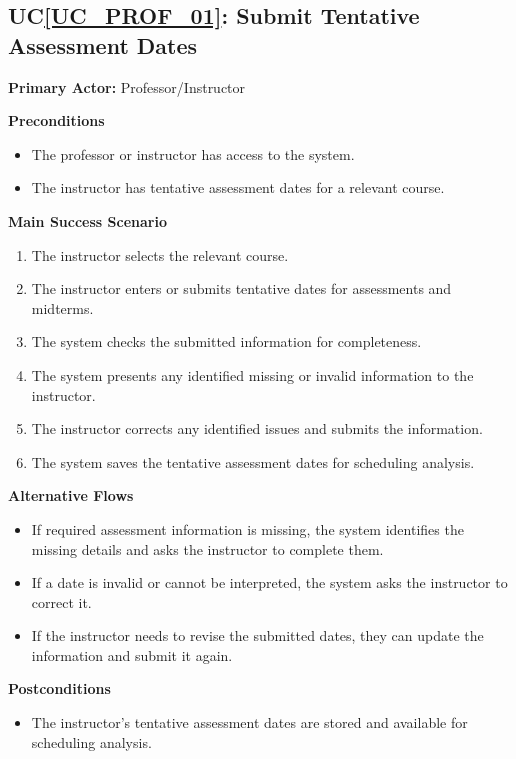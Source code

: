 \documentclass[12pt]{article}
\newcounter{ucnum} %
\newcommand{\ucref}[1]{UC\ref{#1}}
\begin{document}
 \label{UC_PROF_01}
\subsection{\ucref{UC_PROF_01}: Submit Tentative Assessment Dates}

\noindent \textbf{Primary Actor:} Professor/Instructor

\noindent \textbf{Preconditions}
\begin{itemize}
  \item The professor or instructor has access to the system.
  \item The instructor has tentative assessment dates for a relevant course.
\end{itemize}

\noindent \textbf{Main Success Scenario}
\begin{enumerate}
  \item The instructor selects the relevant course.
  \item The instructor enters or submits tentative dates for assessments and midterms.
  \item The system checks the submitted information for completeness.
  \item The system presents any identified missing or invalid information to the instructor.
  \item The instructor corrects any identified issues and submits the information.
  \item The system saves the tentative assessment dates for scheduling analysis.
\end{enumerate}

\noindent \textbf{Alternative Flows}
\begin{itemize}
  \item If required assessment information is missing, the system identifies the missing details and asks the instructor to complete them.
  \item If a date is invalid or cannot be interpreted, the system asks the instructor to correct it.
  \item If the instructor needs to revise the submitted dates, they can update the information and submit it again.
\end{itemize}

\noindent \textbf{Postconditions}
\begin{itemize}
  \item The instructor's tentative assessment dates are stored and available for scheduling analysis.
\end{itemize}
\end{document}
